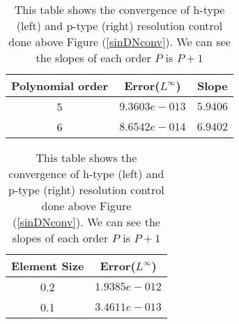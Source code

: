 \begin{table}[h]
\centering \caption{\label{hconv2t} This table shows the convergence of h-type (left) and p-type (right) resolution control done above Figure (\ref{sinDNconv}). We can see the slopes of each order $P$ is $P+1$ }
\begin{tabular}{|c|c|c|} \hline
    Polynomial order&Error($L^{\infty}$)&Slope   \\ \hline \hline
    5&$9.3603e-013$ &$5.9406$ \\ \hline
    6&$8.6542e-014$ &$6.9402$ \\ \hline
\end{tabular}
\hspace{.5in}
\begin{tabular}{|c|c|} \hline
    Element Size&Error($L^{\infty}$)\\ \hline
    0.2&$1.9385e-012$  \\ \hline
    0.1&$3.4611e-013$  \\ \hline
\end{tabular}

\end{table}
